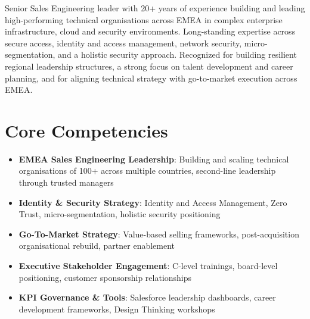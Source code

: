 \documentclass[11pt,a4paper,sans]{moderncv}
\begin{document}
\makecvtitle


\vspace{6pt}
\small{Senior Sales Engineering leader with 20+ years of experience building and leading high-performing technical organisations across EMEA in complex enterprise infrastructure, cloud and security environments. Long-standing expertise across secure access, identity and access management, network security, micro-segmentation, and a holistic security approach. Recognized for building resilient regional leadership structures, a strong focus on talent development and career planning, and for aligning technical strategy with go-to-market execution across EMEA.}


\section{Core Competencies}
\vspace{1pt}
\begin{itemize}

\item \textbf{EMEA Sales Engineering Leadership}: Building and scaling technical organisations of 100+ across multiple countries, second-line leadership through trusted managers

\item \textbf{Identity \& Security Strategy}: Identity and Access Management, Zero Trust, micro-segmentation, holistic security positioning

\item \textbf{Go-To-Market Strategy}: Value-based selling frameworks, post-acquisition organisational rebuild, partner enablement

\item \textbf{Executive Stakeholder Engagement}: C-level trainings, board-level positioning, customer sponsorship relationships

\item \textbf{KPI Governance \& Tools}: Salesforce leadership dashboards, career development frameworks, Design Thinking workshops

\end{itemize}
\end{document}
